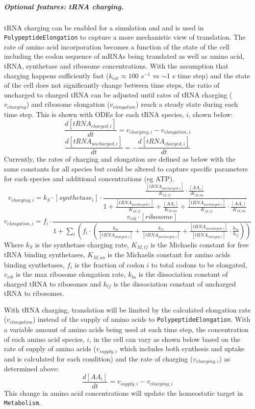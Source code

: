 \documentclass[12pt]{article}
\begin{document}
\subparagraph{Optional features: tRNA charging.}
tRNA charging can be enabled for a simulation and and is used in \texttt{PolypeptideElongation} to capture a more mechanistic view of translation.  The rate of amino acid incorporation becomes a function of the state of the cell including the codon sequence of mRNAs being translated as well as amino acid, tRNA, synthetase and ribosome concentrations.  With the assumption that charging happens sufficiently fast ($k_{cat} \approx 100$ $s^{-1}$ vs $\sim$1 s time step) and the state of the cell does not significantly change between time steps, the ratio of uncharged to charged tRNA can be adjusted until rates of tRNA charging ($v_{charging}$) and ribosome elongation ($v_{elongation}$) reach a steady state during each time step.  This is shown with ODEs for each tRNA species, $i$, shown below:
\[\frac{d[tRNA_{charged,i}]}{dt} = v_{charging,i} - v_{elongation,i}\]
\[\frac{d[tRNA_{uncharged,i}]}{dt} = -\frac{d[tRNA_{charged,i}]}{dt}\]
Currently, the rates of charging and elongation are defined as below with the same constants for all species but could be altered to capture specific parameters for each species and additional concentrations (eg ATP).
\[v_{charging,i} = k_{S}\cdot[synthetase_i]\cdot\frac{\frac{[tRNA_{uncharged,i}]}{K_{M,tf}}\cdot\frac{[AA_i]}{\cdot K_{M,aa}}}{1 + \frac{[tRNA_{uncharged,i}]}{K_{M,tf}} + \frac{[AA_i]}{K_{M,aa}} + \frac{[tRNA_{uncharged,i}]}{K_{M,tf}}\cdot\frac{[AA_i]}{\cdot K_{M,aa}}}\]
\[v_{elongation,i} = f_i\cdot\frac{v_{rib}\cdot[ribosome]}{1 + \sum\limits_i(f_i\cdot(\frac{k_{ta}}{[tRNA_{charged,i}]} + \frac{k_{tf}}{[tRNA_{uncharged,i}]} + \frac{[tRNA_{uncharged,i}]}{[tRNA_{charged,i}]}\cdot\frac{k_{ta}}{k_{tf}}))}\]
Where $k_S$ is the synthetase charging rate, $K_{M,tf}$ is the Michaelis constant for free tRNA binding synthetases, $K_{M,aa}$ is the Michaelis constant for amino acids binding synthetases, $f_i$ is the fraction of codon $i$ to total codons to be elongated, $v_{rib}$ is the max ribosome elongation rate, $k_{ta}$ is the dissociation constant of charged tRNA to ribosomes and $k_{tf}$ is the dissociation constant of uncharged tRNA to ribosomes.

With tRNA charging, translation will be limited by the calculated elongation rate ($v_{elongation}$) instead of the supply of amino acids to \texttt{PolypeptideElongation}.  With a variable amount of amino acids being used at each time step, the concentration of each amino acid species, $i$, in the cell can vary as shown below based on the rate of supply of amino acids ($v_{supply,i}$ which includes both synthesis and uptake and is calculated for each condition) and the rate of charging ($v_{charging,i}$) as determined above:
\[\frac{d[AA_i]}{dt} = v_{supply,i} - v_{charging,i}\]
This change in amino acid concentrations will update the homeostatic target in \texttt{Metabolism}.\\
\end{document}
